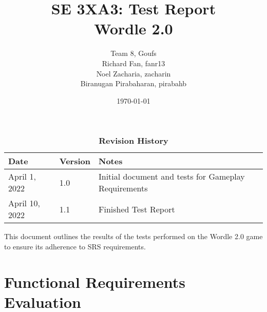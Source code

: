 \documentclass[12pt, titlepage]{article}
\title{SE 3XA3: Test Report\\Wordle 2.0}
\author{Team 8, Goufs
		\\ Richard Fan, fanr13
		\\ Noel Zacharia, zacharin
		\\ Biranugan Pirabaharan, pirabahb
}
\date{\today}
\begin{document}
\maketitle

\tableofcontents
\listoftables
\listoffigures

\begin{table}[bp]
\caption{\bf Revision History}
\begin{tabularx}{\textwidth}{p{3cm}p{2cm}X}
\toprule {\bf Date} & {\bf Version} & {\bf Notes}\\
\midrule
April 1, 2022 & 1.0 & Initial document and tests for Gameplay Requirements\\
April 10, 2022 & 1.1 & Finished Test Report\\
\bottomrule
\end{tabularx}
\end{table}


\newpage
This document outlines the results of the tests performed on the Wordle 2.0 game to ensure its adherence to SRS requirements. 
\newpage
\section{Functional Requirements Evaluation}
\end{document}
